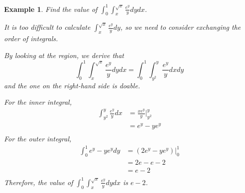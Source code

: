 \documentclass{article}
\newtheorem{example}{Example}
\begin{document}
\begin{example}
  Find the value of $\int_0^1 \int_x^{\sqrt{x}} \frac{e^y}{y} dy dx$.

  It is too difficult to calculate $\int_x^{\sqrt{x}} \frac{e^y}{y} dy$, so we 
  need to consider exchanging the order of integrals.

  By looking at the region, we derive that
  \begin{equation*}
    \int_0^1 \int_x^{\sqrt{x}} \frac{e^y}{y} dy dx = \int_0^1 \int_{y^2}^y \frac{e^y}{y} dx dy
  \end{equation*}
  and the one on the right-hand side is doable.

  For the inner integral,
  \begin{equation*}
    \begin{split}
      \int_{y^2}^y \frac{e^y}{y} dx &= \frac{xe^y}{y}|_{y^2}^y \\
                                    &= e^y - ye^y \\
    \end{split}
  \end{equation*}
  For the outer integral,
  \begin{equation*}
    \begin{split}
      \int_0^1 e^y - ye^y dy &= (2e^y - ye^y)|_0^1 \\
                             &= 2e - e - 2 \\
                             &= e - 2 \\
    \end{split}
  \end{equation*}
  Therefore, the value of $\int_0^1 \int_x^{\sqrt{x}} \frac{e^y}{y} dy dx$ is 
  $e - 2$.
\end{example}
\end{document}
